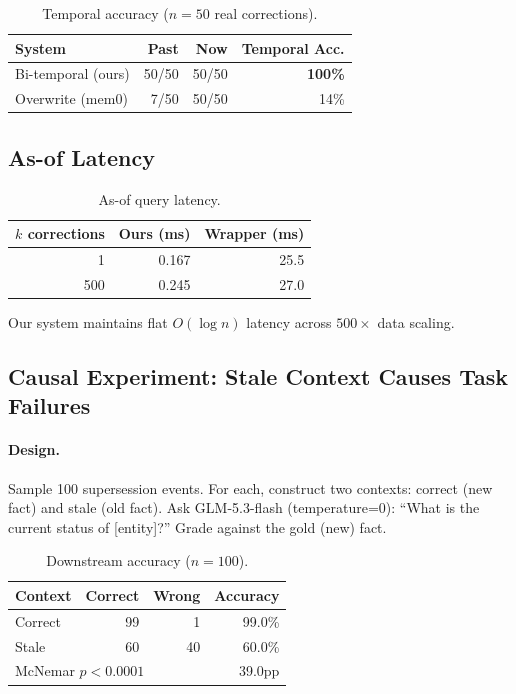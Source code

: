 \documentclass[sigconf]{acmart}
\begin{document}
\begin{table}[h]
\centering
\small
\caption{Temporal accuracy ($n{=}50$ real corrections).}
\begin{tabular}{lrrr}
\toprule
System & Past & Now & Temporal Acc. \\
\midrule
Bi-temporal (ours) & 50/50 & 50/50 & \textbf{100\%} \\
Overwrite (mem0) & 7/50 & 50/50 & 14\% \\
\bottomrule
\end{tabular}
\label{tab:temporal}
\end{table}

\subsection{As-of Latency}

\begin{table}[h]
\centering
\small
\caption{As-of query latency.}
\begin{tabular}{rrr}
\toprule
$k$ corrections & Ours (ms) & Wrapper (ms) \\
\midrule
1 & 0.167 & 25.5 \\
500 & 0.245 & 27.0 \\
\bottomrule
\end{tabular}
\label{tab:latency}
\end{table}

Our system maintains flat $O(\log n)$ latency across $500\times$ data scaling.

\subsection{Causal Experiment: Stale Context Causes Task Failures}
\label{sec:causal}

\paragraph{Design.} Sample 100 supersession events. For each, construct two contexts: correct (new fact) and stale (old fact). Ask GLM-5.3-flash (temperature=0): ``What is the current status of [entity]?'' Grade against the gold (new) fact.

\begin{table}[h]
\centering
\small
\caption{Downstream accuracy ($n{=}100$).}
\begin{tabular}{lrrr}
\toprule
Context & Correct & Wrong & Accuracy \\
\midrule
Correct & 99 & 1 & 99.0\% \\
Stale & 60 & 40 & 60.0\% \\
\midrule
\multicolumn{3}{l}{McNemar $p < 0.0001$} & \multicolumn{1}{r}{39.0pp} \\
\bottomrule
\end{tabular}
\label{tab:causal}
\end{table}
\end{document}
